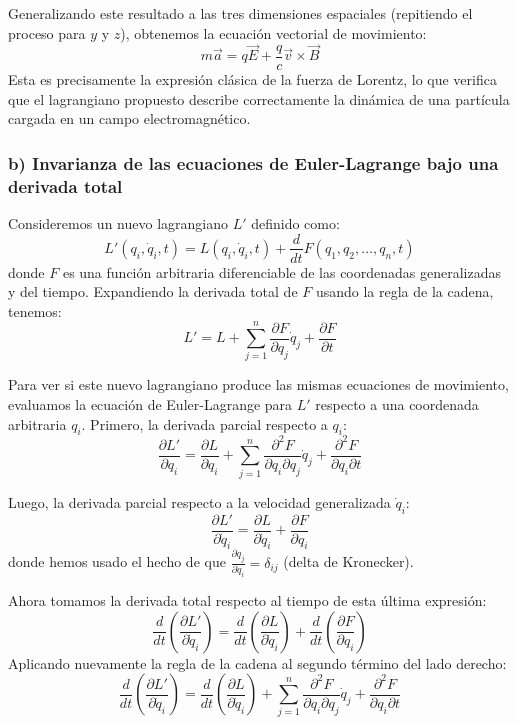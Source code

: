 \documentclass[a4paper]{article}
\begin{document}
Generalizando este resultado a las tres dimensiones espaciales (repitiendo el proceso para $y$ y $z$), obtenemos la ecuación vectorial de movimiento:
$$m\vec{a} = q\vec{E} + \frac{q}{c}\vec{v} \times \vec{B}$$
Esta es precisamente la expresión clásica de la fuerza de Lorentz, lo que verifica que el lagrangiano propuesto describe correctamente la dinámica de una partícula cargada en un campo electromagnético.

\subsubsection*{b) Invarianza de las ecuaciones de Euler-Lagrange bajo una derivada total}

Consideremos un nuevo lagrangiano $L'$ definido como:
$$L'(q_i, \dot{q}_i, t) = L(q_i, \dot{q}_i, t) + \frac{d}{dt}F(q_1, q_2, \dots, q_n, t)$$
donde $F$ es una función arbitraria diferenciable de las coordenadas generalizadas y del tiempo. Expandiendo la derivada total de $F$ usando la regla de la cadena, tenemos:
$$L' = L + \sum_{j=1}^n \frac{\partial F}{\partial q_j}\dot{q}_j + \frac{\partial F}{\partial t}$$

Para ver si este nuevo lagrangiano produce las mismas ecuaciones de movimiento, evaluamos la ecuación de Euler-Lagrange para $L'$ respecto a una coordenada arbitraria $q_i$. Primero, la derivada parcial respecto a $q_i$:
$$\frac{\partial L'}{\partial q_i} = \frac{\partial L}{\partial q_i} + \sum_{j=1}^n \frac{\partial^2 F}{\partial q_i \partial q_j}\dot{q}_j + \frac{\partial^2 F}{\partial q_i \partial t}$$

Luego, la derivada parcial respecto a la velocidad generalizada $\dot{q}_i$:
$$\frac{\partial L'}{\partial \dot{q}_i} = \frac{\partial L}{\partial \dot{q}_i} + \frac{\partial F}{\partial q_i}$$
donde hemos usado el hecho de que $\frac{\partial \dot{q}_j}{\partial \dot{q}_i} = \delta_{ij}$ (delta de Kronecker).

Ahora tomamos la derivada total respecto al tiempo de esta última expresión:
$$\frac{d}{dt}\left(\frac{\partial L'}{\partial \dot{q}_i}\right) = \frac{d}{dt}\left(\frac{\partial L}{\partial \dot{q}_i}\right) + \frac{d}{dt}\left(\frac{\partial F}{\partial q_i}\right)$$
Aplicando nuevamente la regla de la cadena al segundo término del lado derecho:
$$\frac{d}{dt}\left(\frac{\partial L'}{\partial \dot{q}_i}\right) = \frac{d}{dt}\left(\frac{\partial L}{\partial \dot{q}_i}\right) + \sum_{j=1}^n \frac{\partial^2 F}{\partial q_i \partial q_j}\dot{q}_j + \frac{\partial^2 F}{\partial q_i \partial t}$$
\end{document}
